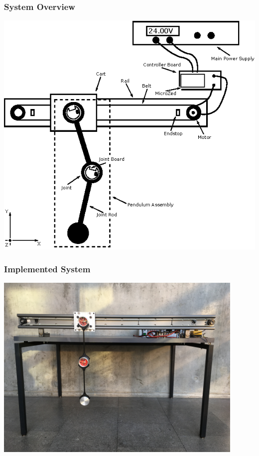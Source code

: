 \documentclass[mathserif]{beamer}
\begin{document}
\begin{frame}[c]\frametitle{System Overview}
\centering
\includegraphics[scale=1]{graphics/system_overview}
\end{frame}

\begin{frame}[c]\frametitle{Implemented System}
\centering
\includegraphics[width=0.9\textwidth]{graphics/full_system_finish}
\end{frame}
\end{document}
